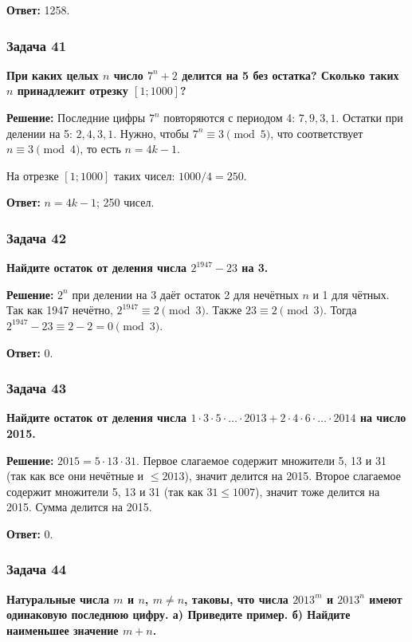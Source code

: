 \documentclass[12pt, a4paper]{article}
\begin{document}
\textbf{Ответ:} 1258.

\subsubsection*{Задача 41}
\textbf{При каких целых $n$ число $7^n + 2$ делится на 5 без остатка? Сколько таких $n$ принадлежит отрезку $[1;1000]$?}

\textbf{Решение:}
Последние цифры $7^n$ повторяются с периодом 4: $7, 9, 3, 1$. Остатки при делении на 5: $2, 4, 3, 1$. Нужно, чтобы $7^n \equiv 3 \pmod{5}$, что соответствует $n \equiv 3 \pmod{4}$, то есть $n = 4k-1$.

На отрезке $[1;1000]$ таких чисел: $1000/4 = 250$.

\textbf{Ответ:} $n = 4k-1$; 250 чисел.

\subsubsection*{Задача 42}
\textbf{Найдите остаток от деления числа $2^{1947} - 23$ на 3.}

\textbf{Решение:}
$2^n$ при делении на 3 даёт остаток 2 для нечётных $n$ и 1 для чётных. Так как 1947 нечётно, $2^{1947} \equiv 2 \pmod{3}$. Также $23 \equiv 2 \pmod{3}$. Тогда $2^{1947} - 23 \equiv 2 - 2 = 0 \pmod{3}$.

\textbf{Ответ:} 0.

\subsubsection*{Задача 43}
\textbf{Найдите остаток от деления числа $1 \cdot 3 \cdot 5 \cdot \ldots \cdot 2013 + 2 \cdot 4 \cdot 6 \cdot \ldots \cdot 2014$ на число 2015.}

\textbf{Решение:}
$2015 = 5 \cdot 13 \cdot 31$. Первое слагаемое содержит множители 5, 13 и 31 (так как все они нечётные и $\le 2013$), значит делится на 2015. Второе слагаемое содержит множители 5, 13 и 31 (так как $31 \le 1007$), значит тоже делится на 2015. Сумма делится на 2015.

\textbf{Ответ:} 0.

\subsubsection*{Задача 44}
\textbf{Натуральные числа $m$ и $n$, $m \neq n$, таковы, что числа $2013^m$ и $2013^n$ имеют одинаковую последнюю цифру. а) Приведите пример. б) Найдите наименьшее значение $m+n$.}
\end{document}
